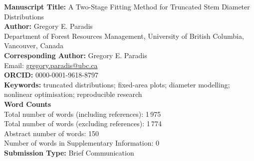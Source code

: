 \documentclass[12pt]{article}
\begin{document}
\thispagestyle{empty}
\doublespacing

\textbf{Manuscript Title:} A Two-Stage Fitting Method for Truncated Stem Diameter Distributions\\[1ex]
\textbf{Author:} Gregory E. Paradis\\
Department of Forest Resources Management, University of British Columbia, Vancouver, Canada\\[1ex]
\textbf{Corresponding Author:} Gregory E. Paradis\\
Email: \href{mailto:gregory.paradis@ubc.ca}{gregory.paradis@ubc.ca}\\[1ex]
\textbf{ORCID:} 0000-0001-9618-8797\\[1ex]
\textbf{Keywords:} truncated distributions; fixed-area plots; diameter modelling; nonlinear optimisation; reproducible research\\[1ex]
\textbf{Word Counts}\\
Total number of words (including references): 1\,975\\
Total number of words (excluding references): 1\,774\\
Abstract number of words: 150\\
Number of words in Supplementary Information: 0\\[1ex]
\textbf{Submission Type:} Brief Communication\\
\end{document}
